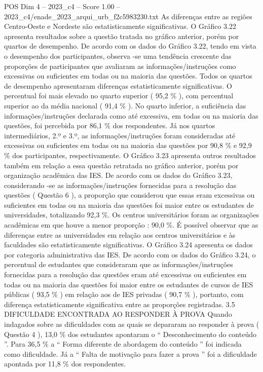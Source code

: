 \begin{textsample}{POS Dim 4 – 2023\_c4 – Score 1.00 – 2023\_c4/enade\_2023\_arqui\_urb\_f2c5983230.txt}
As diferenças entre as regiões Centro-Oeste e Nordeste são estatisticamente significativas.
O Gráfico 3.22 apresenta resultados sobre a questão tratada no gráfico anterior, porém por quartos de desempenho.
De acordo com os dados do Gráfico 3.22, tendo em vista o desempenho dos participantes, observa -se uma tendência crescente das proporções de participantes que avaliaram as informações/instruções como excessivas ou suficientes em todas ou na maioria das questões.
Todos os quartos de desempenho apresentaram diferenças estatisticamente significativas.
O percentual foi mais elevado no quarto superior ( 95,2 \% ), com percentual superior ao da média nacional ( 91,4 \% ).
No quarto inferior, a suficiência das informações/instruções declarada como até excessiva, em todas ou na maioria das questões, foi percebida por 86,1 \% dos respondentes.
Já nos quartos intermediários, 2.º e 3.º, as informações/instruções foram consideradas até excessivas ou suficientes em todas ou na maioria das questões por 90,8 \% e 92,9 \% dos participantes, respectivamente.
O Gráfico 3.23 apresenta outros resultados também em relação a essa questão retratada no gráfico anterior, porém por organização acadêmica das IES.
De acordo com os dados do Gráfico 3.23, considerando -se as informações/instruções fornecidas para a resolução das questões ( Questão 6 ), a proporção que considerou que essas eram excessivas ou suficientes em todas ou na maioria das questões foi maior entre os estudantes de universidades, totalizando 92,3 \%.
Os centros universitários foram as organizações acadêmicas em que houve a menor proporção : 90,0 \%.
É possível observar que as diferenças entre as universidades em relação aos centros universitários e às faculdades são estatisticamente significativas.
O Gráfico 3.24 apresenta os dados por categoria administrativa das IES.
De acordo com os dados do Gráfico 3.24, o percentual de estudantes que consideraram que as informações/instruções fornecidas para a resolução das questões eram até excessivas ou suficientes em todas ou na maioria das questões foi maior entre os estudantes de cursos de IES públicas ( 93,5 \% ) em relação aos de IES privadas ( 90,7 \% ), portanto, com diferença estatisticamente significativa entre as proporções registradas. 3.5 DIFICULDADE ENCONTRADA AO RESPONDER À PROVA Quando indagados sobre as dificuldades com as quais se depararam ao responder à prova ( Questão 4 ), 13,0 \% dos estudantes apontaram o “ Desconhecimento do conteúdo ”.
Para 36,5 \% a “ Forma diferente de abordagem do conteúdo ” foi indicada como dificuldade.
Já a “ Falta de motivação para fazer a prova ” foi a dificuldade apontada por 11,8 \% dos respondentes.

\end{textsample}
